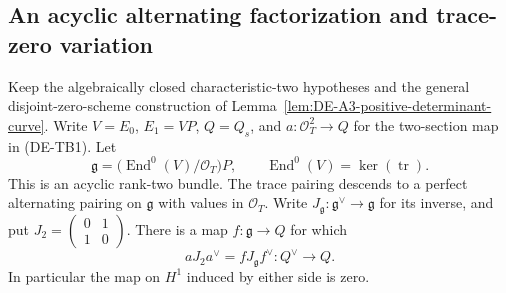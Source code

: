 \subsection{An acyclic alternating factorization and trace-zero variation}

\begin{lemma}
\label{lem:DE-A3-positive-acyclic-alternating-candidate}
Keep the algebraically closed characteristic-two hypotheses and the
general disjoint-zero-scheme construction of
Lemma~\ref{lem:DE-A3-positive-determinant-curve}. Write
$V=E_0$, $E_1=VP$, $Q=Q_s$, and
$a:\mathcal O_T^2\to Q$ for the two-section map in (DE-TB1).
Let
\[
 \mathfrak g=\bigl(\operatorname{End}^0(V)/\mathcal O_T\bigr)P,
 \qquad \operatorname{End}^0(V)=\ker(\operatorname{tr}).
\]
This is an acyclic rank-two bundle. The trace pairing descends to a
perfect alternating pairing on $\mathfrak g$ with values in
$\mathcal O_T$. Write $J_{\mathfrak g}:\mathfrak g^\vee\to\mathfrak g$
for its inverse, and put $J_2=\left(\begin{smallmatrix}0&1\\1&0\end{smallmatrix}\right)$.
There is a map $f:\mathfrak g\to Q$ for which
\[
                  aJ_2a^\vee=fJ_{\mathfrak g}f^\vee:
                              Q^\vee\longrightarrow Q.       \tag{DE-TZ1}
\]
In particular the map on $H^1$ induced by either side is zero.
\end{lemma}
